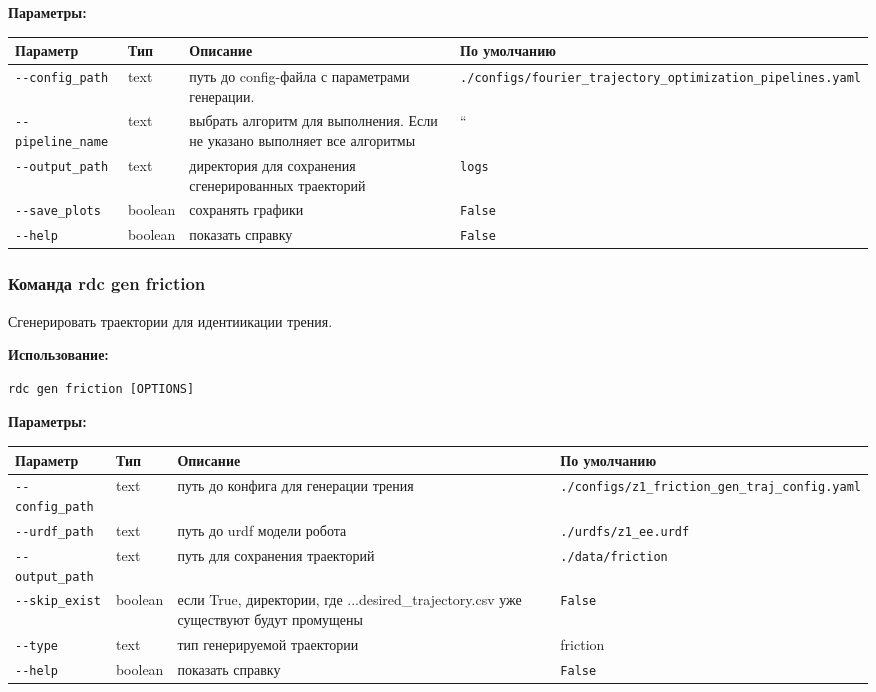 \textbf{Параметры:}
\begin{center}
\fontsize{10pt}{10pt}\selectfont
\begin{longtable}[]{p{5cm}|p{2cm}|p{3.5cm}|p{5cm}}
    \hline
\toprule()
Параметр & Тип & Описание & По умолчанию \\
\hline
\midrule()
\endhead
\texttt{-\/-config\_path} & text & путь до config-файла с параметрами генерации. &
\texttt{./configs/fourier\_trajectory\_optimization\_pipelines.yaml} \\
\hline
\texttt{-\/-pipeline\_name} & text & выбрать алгоритм для выполнения. Если не указано выполняет все алгоритмы & `` \\
\hline
\texttt{-\/-output\_path} & text & директория для сохранения сгенерированных траекторий & \texttt{logs} \\
\hline
\texttt{-\/-save\_plots} & boolean & сохранять графики &
\texttt{False} \\
\hline
\texttt{-\/-help} & boolean & показать справку &
\texttt{False} \\
\hline
\bottomrule()
\hline
\end{longtable}
\end{center}

\hypertarget{rdc-gen-friction}{%
\subsubsection{Команда rdc gen friction}\label{rdc-gen-friction}}

Сгенерировать траектории для идентиикации трения.

\textbf{Использование:}
\begin{lstlisting}[language=python, numbers=none, frame=single]
rdc gen friction [OPTIONS]
\end{lstlisting}

\textbf{Параметры:}
\begin{center}
\fontsize{10pt}{10pt}\selectfont
\begin{longtable}[]{p{5cm}|p{2cm}|p{3.5cm}|p{5cm}}
    \hline
\toprule()
Параметр & Тип & Описание & По умолчанию \\
\hline
\midrule()
\endhead
\texttt{-\/-config\_path} & text & путь до конфига для генерации трения &
\texttt{./configs/z1\_friction\_gen\_traj\_config.yaml} \\
\hline
\texttt{-\/-urdf\_path} & text & путь до urdf модели робота&
\texttt{./urdfs/z1\_ee.urdf} \\
\hline
\texttt{-\/-output\_path} & text & путь для сохранения траекторий &
\texttt{./data/friction} \\
\hline
\texttt{-\/-skip\_exist} & boolean & если True, директории, где ...desired\_trajectory.csv уже существуют будут промущены & \texttt{False} \\
\hline
\texttt{-\/-type} & text & тип генерируемой траектории & friction \\
\hline
\texttt{-\/-help} & boolean & показать справку &
\texttt{False} \\
\bottomrule()
\hline
\end{longtable}
\end{center}

